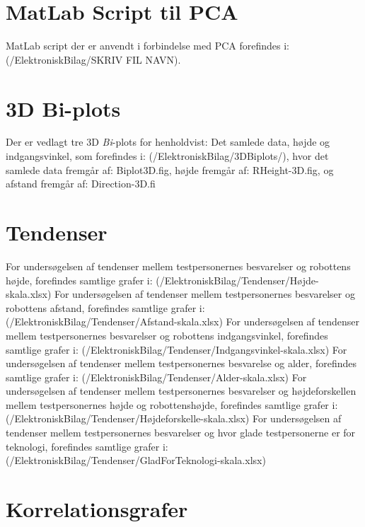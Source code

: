 \section{MatLab Script til PCA}
\label{ElektroniskBilagMatLabPCA}
%
MatLab script der er anvendt i forbindelse med PCA forefindes i: (/ElektroniskBilag/SKRIV FIL NAVN).


\section{3D Bi-plots}
\label{ElektroniskBilag3D}
%
Der er vedlagt tre 3D \textit{Bi}-plots for henholdvist: Det samlede data, højde og indgangsvinkel, som forefindes i: (/ElektroniskBilag/3DBiplots/), hvor det samlede data fremgår af: Biplot3D.fig, højde fremgår af: RHeight-3D.fig, og afstand fremgår af: Direction-3D.fi

\section{Tendenser}
\label{ElektroniskBilagTendenser}
%
For undersøgelsen af tendenser mellem testpersonernes besvarelser og robottens højde, forefindes samtlige grafer i: (/ElektroniskBilag/Tendenser/Højde-skala.xlsx)\blankline
%
For undersøgelsen af tendenser mellem testpersonernes besvarelser og robottens afstand, forefindes samtlige grafer i: (/ElektroniskBilag/Tendenser/Afstand-skala.xlsx)\blankline
%
For undersøgelsen af tendenser mellem testpersonernes besvarelser og robottens indgangsvinkel, forefindes samtlige grafer i: (/ElektroniskBilag/Tendenser/Indgangsvinkel-skala.xlsx)\blankline
%
For undersøgelsen af tendenser mellem testpersonernes besvarelse og alder, forefindes samtlige grafer i: (/ElektroniskBilag/Tendenser/Alder-skala.xlsx)\blankline
%
For undersøgelsen af tendenser mellem testpersonernes besvarelser og højdeforskellen mellem testpersonernes højde og robottenshøjde, forefindes samtlige grafer i: \\
(/ElektroniskBilag/Tendenser/Højdeforskelle-skala.xlsx)\blankline
%
For undersøgelsen af tendenser mellem testpersonernes besvarelser og hvor glade testpersonerne er for teknologi, forefindes samtlige grafer i:\\
(/ElektroniskBilag/Tendenser/GladForTeknologi-skala.xlsx)

\section{Korrelationsgrafer}
\label{ElektroniskBilagKorrelationsgrafer}
%



